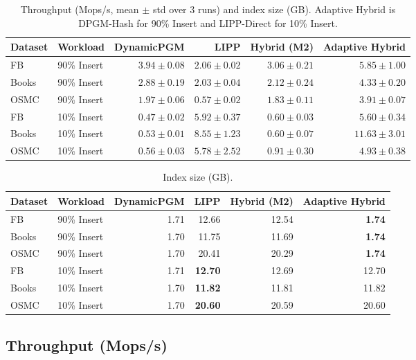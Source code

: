 \documentclass[11pt,letterpaper]{article}
\begin{document}
\begin{table}[h]
\centering
\caption{Throughput (Mops/s, mean $\pm$ std over 3 runs) and index size (GB).
Adaptive Hybrid is DPGM-Hash for 90\% Insert and LIPP-Direct for 10\% Insert.}
\label{tab:results}
\small
\begin{tabular}{llrrrr}
\toprule
Dataset & Workload & DynamicPGM & LIPP & Hybrid (M2) & Adaptive Hybrid \\
\midrule
FB     & 90\% Insert & $3.94\pm0.08$ & $2.06\pm0.02$ & $3.06\pm0.21$ & $\mathbf{5.85\pm1.00}$ \\
Books  & 90\% Insert & $2.88\pm0.19$ & $2.03\pm0.04$ & $2.12\pm0.24$ & $\mathbf{4.33\pm0.20}$ \\
OSMC   & 90\% Insert & $1.97\pm0.06$ & $0.57\pm0.02$ & $1.83\pm0.11$ & $\mathbf{3.91\pm0.07}$ \\
\midrule
FB     & 10\% Insert & $0.47\pm0.02$ & $5.92\pm0.37$ & $0.60\pm0.03$ & $\mathbf{5.60\pm0.34}$ \\
Books  & 10\% Insert & $0.53\pm0.01$ & $8.55\pm1.23$ & $0.60\pm0.07$ & $11.63\pm3.01$ \\
OSMC   & 10\% Insert & $0.56\pm0.03$ & $5.78\pm2.52$ & $0.91\pm0.30$ & $4.93\pm0.38$ \\
\bottomrule
\end{tabular}
\end{table}

\begin{table}[h]
\centering
\caption{Index size (GB).}
\label{tab:size}
\small
\begin{tabular}{llrrrr}
\toprule
Dataset & Workload & DynamicPGM & LIPP & Hybrid (M2) & Adaptive Hybrid \\
\midrule
FB     & 90\% Insert & 1.71 & 12.66 & 12.54 & \textbf{1.74} \\
Books  & 90\% Insert & 1.70 & 11.75 & 11.69 & \textbf{1.74} \\
OSMC   & 90\% Insert & 1.70 & 20.41 & 20.29 & \textbf{1.74} \\
\midrule
FB     & 10\% Insert & 1.71 & \textbf{12.70} & 12.69 & 12.70 \\
Books  & 10\% Insert & 1.70 & \textbf{11.82} & 11.81 & 11.82 \\
OSMC   & 10\% Insert & 1.70 & \textbf{20.60} & 20.59 & 20.60 \\
\bottomrule
\end{tabular}
\end{table}

\subsection{Throughput (Mops/s)}
\end{document}
